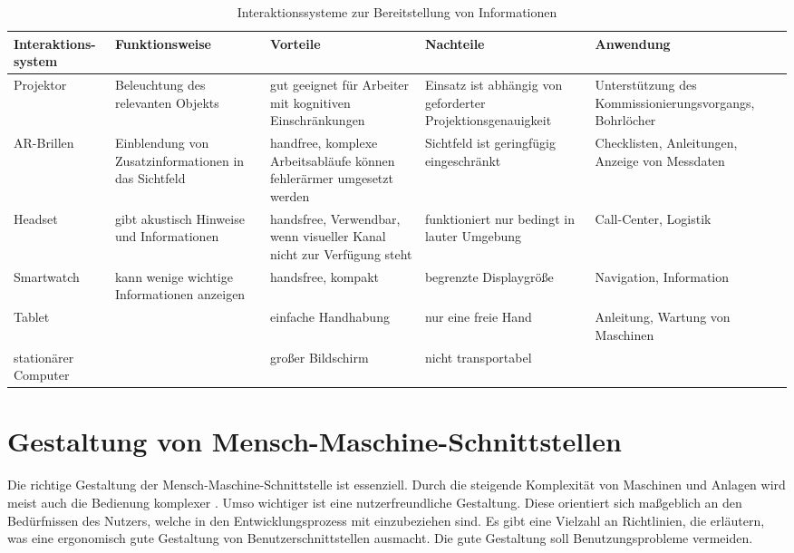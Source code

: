 \begin{sidewaystable}[ph!]
\begin{tabular}{p{}|p{}|p{}|p{}|p{}}
	\textbf{Interaktions-system} & \textbf{Funktionsweise} & \textbf{Vorteile} & \textbf{Nachteile} & \textbf{Anwendung} \\
	\hline
	Projektor & Beleuchtung des relevanten Objekts & gut geeignet für Arbeiter mit kognitiven Einschränkungen & Einsatz ist abhängig von geforderter Projektionsgenauigkeit & Unterstützung des Kommissionierungsvorgangs, Bohrlöcher \\
	\hline
	AR-Brillen & Einblendung von Zusatzinformationen in das Sichtfeld & handfree, komplexe Arbeitsabläufe können fehlerärmer umgesetzt werden & Sichtfeld ist geringfügig eingeschränkt & Checklisten, Anleitungen, Anzeige von Messdaten \\
	\hline
	Headset & gibt akustisch Hinweise und Informationen & handsfree, Verwendbar, wenn visueller Kanal nicht zur Verfügung steht & funktioniert nur bedingt in lauter Umgebung & Call-Center, Logistik \\
	\hline
	Smartwatch & kann wenige wichtige Informationen anzeigen & handsfree, kompakt & begrenzte Displaygröße & Navigation, Information \\
	\hline
	Tablet & & einfache Handhabung & nur eine freie Hand & Anleitung, Wartung von Maschinen\\
	\hline
	stationärer Computer & & großer Bildschirm & nicht transportabel & \\
\end{tabular}
\label{tab:Interaktionssystem}
\caption{Interaktionssysteme zur Bereitstellung von Informationen}
\end{sidewaystable}

\section{Gestaltung von Mensch-Maschine-Schnittstellen}
Die richtige Gestaltung der Mensch-Maschine-Schnittstelle ist essenziell. Durch die steigende Komplexität von Maschinen und Anlagen wird meist auch die Bedienung komplexer \cite{Zuhlke2012}. Umso wichtiger ist eine nutzerfreundliche Gestaltung. Diese orientiert sich maßgeblich an den Bedürfnissen des Nutzers, welche in den Entwicklungsprozess mit einzubeziehen sind. \cite{Heinecke2012, Zuhlke2012} Es gibt eine Vielzahl an Richtlinien, die erläutern, was eine ergonomisch gute Gestaltung von Benutzerschnittstellen ausmacht. Die gute Gestaltung soll Benutzungsprobleme vermeiden.


